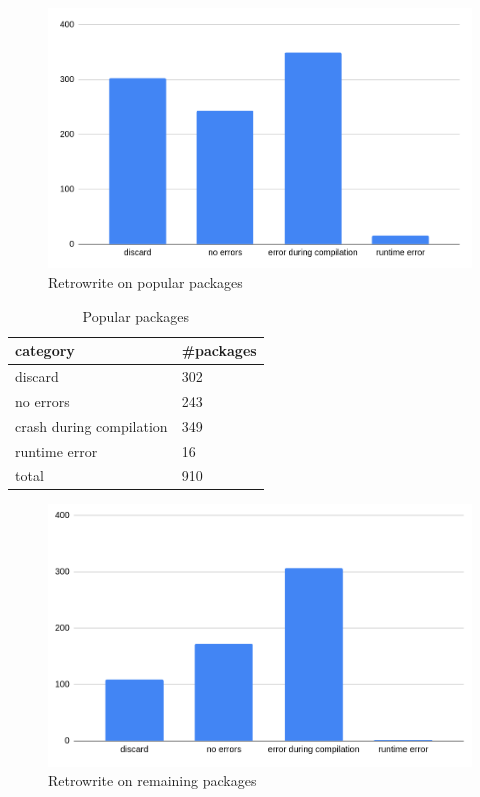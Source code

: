 \documentclass[a4paper,11pt,oneside]{report}
\newcommand{\sysname}{Retrowrite\xspace}
\begin{document}
\begin{figure}[h]
    \centering
    \includegraphics[width=15cm]{popular_packages.png} 
    \caption{\sysname on popular packages}
    \label{fig:popular}
\end{figure}

\begin{table}[h]
    \centering
    \label{table:popular}
    \begin{tabular}{ll}
        \hline
        category                & \#packages \\
        \hline
        discard                  & 302  \\
        no errors                & 243  \\
        crash during compilation & 349  \\
        runtime error            & 16   \\
        total                    & 910  \\ 
        \hline
    \end{tabular}
    \caption{Popular packages}
\end{table}

\newpage

\begin{figure}[h]
    \centering
    \includegraphics[width=15cm]{remaining_packages.png} 
    \caption{\sysname on remaining packages}
    \label{fig:remaining}
\end{figure}
\end{document}
